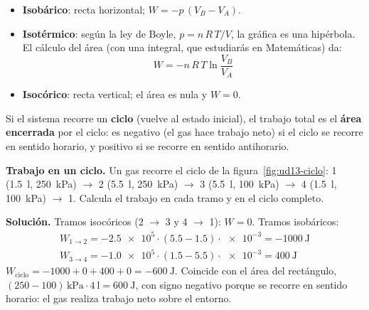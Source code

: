 \begin{itemize}
    \item \textbf{Isobárico}: recta horizontal; \(W = -p\,(V_B - V_A)\).
    \item \textbf{Isotérmico}: según la ley de Boyle, \(p = n\,R\,T/V\), la gráfica es una hipérbola. El cálculo del área (con una
    integral, que estudiarás en Matemáticas) da:
    \[ W = -n\,R\,T \ln\frac{V_B}{V_A} \]
    \item \textbf{Isocórico}: recta vertical; el área es nula y \(W = 0\).
\end{itemize}

Si el sistema recorre un \textbf{ciclo} (vuelve al estado inicial), el trabajo total es el \textbf{área encerrada} por el ciclo:
es negativo (el gas hace trabajo neto) si el ciclo se recorre en sentido horario, y positivo si se recorre en sentido antihorario.

\begin{example}
    \textbf{Trabajo en un ciclo.} Un gas recorre el ciclo de la figura~\ref{fig:ud13-ciclo}: 1 (\qty{1.5}{\litre},
    \qty{250}{\kilo\pascal}) \(\rightarrow\) 2 (\qty{5.5}{\litre}, \qty{250}{\kilo\pascal}) \(\rightarrow\) 3 (\qty{5.5}{\litre},
    \qty{100}{\kilo\pascal}) \(\rightarrow\) 4 (\qty{1.5}{\litre}, \qty{100}{\kilo\pascal}) \(\rightarrow\) 1. Calcula el trabajo en
    cada tramo y en el ciclo completo.

    \textbf{Solución.} Tramos isocóricos (2 \(\rightarrow\) 3 y 4 \(\rightarrow\) 1): \(W = 0\). Tramos isobáricos:
    \begin{gather*}
        W_{1\to2} = -\num{2.5e5} \cdot (\num{5.5} - \num{1.5}) \cdot \num{e-3} = \qty{-1000}{\joule} \\
        W_{3\to4} = -\num{1.0e5} \cdot (\num{1.5} - \num{5.5}) \cdot \num{e-3} = \qty{+400}{\joule}
    \end{gather*}
    \(W_{\text{ciclo}} = -1000 + 0 + 400 + 0 = \qty{-600}{\joule}\). Coincide con el área del rectángulo,
    \((250 - 100)\,\unit{\kilo\pascal} \cdot \qty{4}{\litre} = \qty{600}{\joule}\), con signo negativo porque se recorre en sentido
    horario: el gas realiza trabajo neto sobre el entorno.
\end{example}

